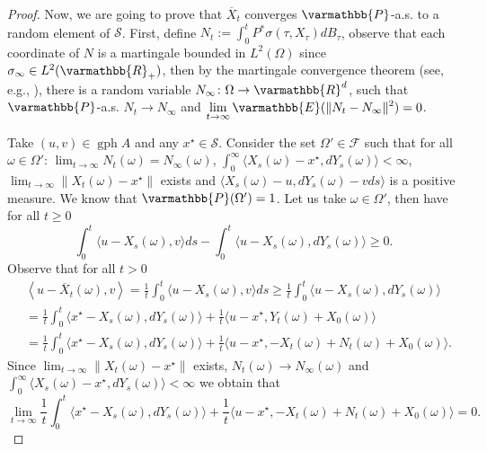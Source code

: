 \documentclass[11pt,reqno]{article}
\let\mathbb=\varmathbb
\newcommand{\R}{\mathbb{R}}
\newcommand{\gph}{\operatorname{gph}}
\newcommand{\1}{\mathds{1}}
\newcommand{\Aver}[2]{\overline{#1}_{#2}}
\numberwithin{equation}{section}  %
\theoremstyle{plain}
\theoremstyle{definition}
\theoremstyle{remark}
\numberwithin{theorem}{section}
\numberwithin{remark}{section}
\numberwithin{example}{section}
\begin{document}
\begin{proof}
    Now, we are going to prove that $\Aver{X}{t} $ converges $\mathbb{P}$-a.s. to a random element of $\mathcal{S}$. First, define  $N_t := \int_0^t P^\ast\sigma(\tau,X_\tau)dB_\tau$, observe that each coordinate of $N$ is a martingale bounded in $L^2(\Omega)$ since $\sigma_\infty\in L^2(\R_+)$, then by the martingale convergence theorem (see, e.g., \cite[Theorem 1.3.5]{MR2380366}), there is a random variable $N_\infty\colon \Omega\to \R^d$, such that $\mathbb{P}$-a.s. $N_t\to N_\infty$ and $\displaystyle\lim_{t\to \infty}\mathbb{E}(\|N_t-N_\infty\|^2)=0$.

    Take $(u,v)\in \gph A$ and any $x^\star\in \mathcal{S}$. Consider the set $\Omega'\in \mathcal{F}$ such that for all $\omega\in \Omega'$: $\displaystyle\lim_{t\to \infty} N_t(\omega) = N_\infty(\omega)$, $\int_0^\infty\langle X_s(\omega)-x^\star,dY_s(\omega)\rangle<\infty$, $\displaystyle\lim_{t\to \infty}\|X_t(\omega)-x^\star\|$ exists and $\langle X_s(\omega)-u,dY_s(\omega)-vds\rangle$ is a positive measure. We know that $\mathbb{P}(\Omega') =1$. Let us take $\omega \in \Omega'$, then have for all $t\geq 0$
    \begin{equation*}
    	\int_0^t \langle u-X_s(\omega),v \rangle ds-\int_0^t\langle  u-X_s(\omega),dY_s(\omega)\rangle\geq 0.
    \end{equation*}
     Observe that for all $t> 0$
    \begin{equation*}
        \begin{aligned}
            &\left\langle u-\Aver{X}{t}(\omega) ,v\right\rangle
            = \frac{1}{t}\int_0^t\langle u-X_s(\omega),v\rangle ds
        \geq  \frac{1}{t}\int_0^t\langle u-X_s(\omega),dY_s(\omega)\rangle\\
        &= \frac{1}{t}\int_0^t\langle x^\star-X_s(\omega),dY_s(\omega)\rangle + \frac{1}{t}\langle u-x^\star,Y_t(\omega)+X_0(\omega)\rangle\\
        & = \frac{1}{t}\int_0^t\langle x^\star-X_s(\omega),dY_s(\omega)\rangle  + \frac{1}{t}\langle u-x^\star,-X_t(\omega) + N_t(\omega) +X_0(\omega)\rangle.
            \end{aligned}
    \end{equation*}
    Since $\displaystyle\lim_{t\to \infty}\|X_t(\omega)-x^\star\|$ exists, $N_t(\omega)\to N_\infty(\omega)$ and $\int_0^\infty\langle X_s(\omega)-x^\star,dY_s(\omega)\rangle<\infty$ we obtain that 
    \begin{equation}\label{eqn-limit-erg111}
    	 \lim_{t\to \infty} \frac{1}{t}\int_0^t\langle x^\star-X_s(\omega),dY_s(\omega)\rangle + \frac{1}{t}\langle u-x^\star,-X_t(\omega) + N_t(\omega) +X_0(\omega)\rangle = 0.

\end{equation}
\end{proof}
\end{document}

